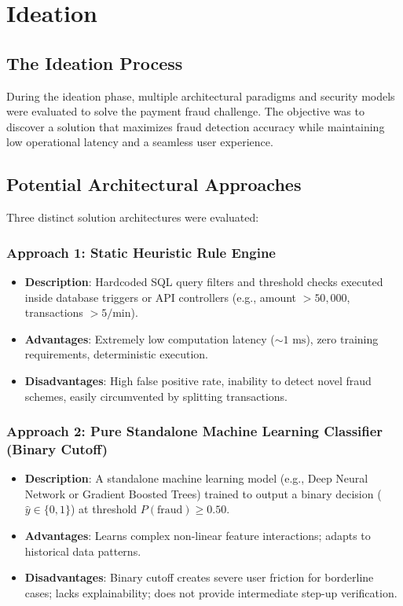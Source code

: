 \chapter{Ideation}
\label{chap:ideation}

\section{The Ideation Process}
During the ideation phase, multiple architectural paradigms and security models were evaluated to solve the payment fraud challenge. The objective was to discover a solution that maximizes fraud detection accuracy while maintaining low operational latency and a seamless user experience.

\section{Potential Architectural Approaches}
Three distinct solution architectures were evaluated:

\subsection{Approach 1: Static Heuristic Rule Engine}
\begin{itemize}
    \item \textbf{Description}: Hardcoded SQL query filters and threshold checks executed inside database triggers or API controllers (e.g., amount $> 50,000$, transactions $> 5/\text{min}$).
    \item \textbf{Advantages}: Extremely low computation latency ($\sim 1\text{ ms}$), zero training requirements, deterministic execution.
    \item \textbf{Disadvantages}: High false positive rate, inability to detect novel fraud schemes, easily circumvented by splitting transactions.
\end{itemize}

\subsection{Approach 2: Pure Standalone Machine Learning Classifier (Binary Cutoff)}
\begin{itemize}
    \item \textbf{Description}: A standalone machine learning model (e.g., Deep Neural Network or Gradient Boosted Trees) trained to output a binary decision ($\hat{y} \in \{0, 1\}$) at threshold $P(\text{fraud}) \ge 0.50$.
    \item \textbf{Advantages}: Learns complex non-linear feature interactions; adapts to historical data patterns.
    \item \textbf{Disadvantages}: Binary cutoff creates severe user friction for borderline cases; lacks explainability; does not provide intermediate step-up verification.
\end{itemize}

